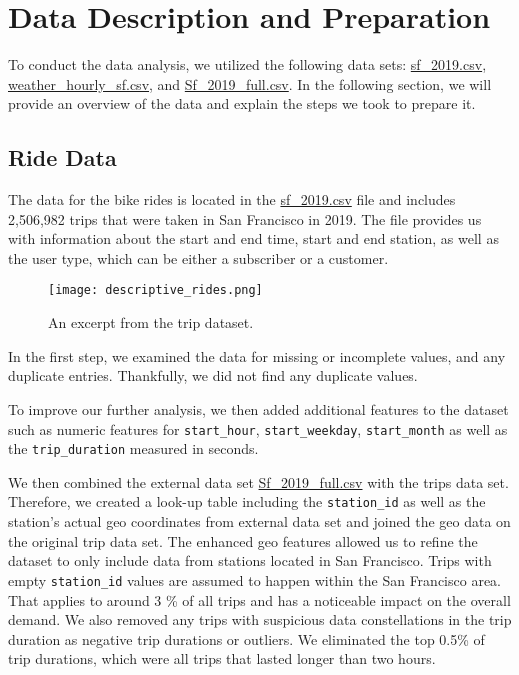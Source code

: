 \chapter{Data Description and Preparation}
To conduct the data analysis, we utilized the following data sets: \href{run:../../data/sf_2019.csv}{sf\_2019.csv}, \href{run:../../data/weather_hourly_sf.csv}{weather\_hourly\_sf.csv}, and \href{run:../../data/Sf_2019_full.csv}{Sf\_2019\_full.csv}. In the following section, we will provide an overview of the data and explain the steps we took to prepare it.

\section{Ride Data}
The data for the bike rides is located in the \href{run:../../data/sf_2019.csv}{sf\_2019.csv} file and includes 2,506,982 trips that were taken in San Francisco in 2019. The file provides us with information about the start and end time, start and end station, as well as the user type, which can be either a subscriber or a customer. 

\begin{figure}[h]
    \texttt{[image: descriptive\_rides.png]}
    \caption{An excerpt from the trip dataset.}
\end{figure}

In the first step, we examined the data for missing or incomplete values, and any duplicate entries. Thankfully, we did not find any duplicate values.

To improve our further analysis, we then added additional features to the dataset such as numeric features for \texttt{start\_hour}, \texttt{start\_weekday}, \texttt{start\_month} as well as the \texttt{trip\_duration} measured in seconds.

We then combined the external data set \href{run:../../data/Sf_2019_full.csv}{Sf\_2019\_full.csv} with the trips data set. Therefore, we created a look-up table including the \texttt{station\_id} as well as the station's actual geo coordinates from external data set and joined the geo data on the original trip data set. 
The enhanced geo features allowed us to refine the dataset to only include data from stations located in San Francisco. Trips with empty \texttt{station\_id} values are assumed to happen within the San Francisco area. That applies to around 3 \% of all trips and has a noticeable impact on the overall demand. We also removed any trips with suspicious data constellations in the trip duration as negative trip durations or outliers. We eliminated the top 0.5\% of trip durations, which were all trips that lasted longer than two hours. 

